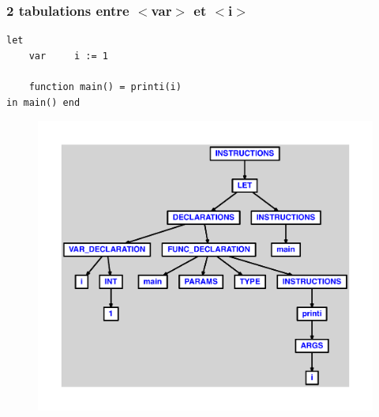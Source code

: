 \documentclass{article}
\begin{document}
\subsubsection{2 tabulations entre $ < $var$ > $ et $ < $i$ > $}
\begin{lstlisting}
let
	var		i := 1

	function main() = printi(i)
in main() end
\end{lstlisting}
\newpage
\begin{figure}[H]
\centering
\includegraphics[max width=\textwidth]{ast/ast_187.pdf}
\end{figure}
\newpage
\end{document}
